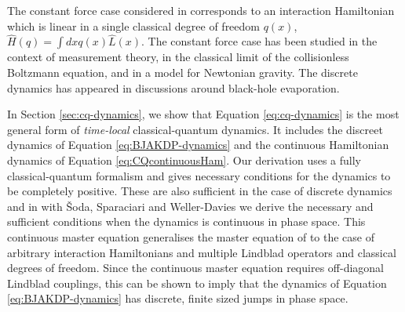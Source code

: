 \documentclass[aps,pra,showpacs,citeautoscript,amsmath,amssymb,floatfix,superscriptaddress,bbm, verbatim,amsfonts,changes,10pt,nofootinbib,longbibliography]{revtex4-1}
\def\L{{\hat{L}}}
\def\Hq{\hat{H}}
\begin{document}
The constant force case considered in \cite{diosi1995quantum} corresponds to an interaction Hamiltonian which is linear in a single classical degree of freedom $q(x)$,  $\Hq(q)=\int dx q(x)\L(x)$.  The constant force case has
been studied in the context of measurement theory\cite{diosi2014hybrid}, in the classical limit of the collisionless Boltzmann equation\cite{alicki2003completely}, and in a model for Newtonian gravity\cite{diosi2011gravity}. The discrete dynamics has appeared in discussions around black-hole evaporation\cite{poulinKITP}. %


 In Section \ref{sec:cq-dynamics}, we show that Equation \eqref{eq:cq-dynamics} is the most general form of  {\it time-local}\cite{ktimelocal_foot}
  classical-quantum dynamics. It includes the discreet dynamics of Equation \eqref{eq:BJAKDP-dynamics} and the continuous Hamiltonian dynamics of Equation \eqref{eq:CQcontinuousHam}.
 Our derivation uses a fully classical-quantum formalism and gives necessary conditions for the dynamics to be completely positive. %
These are also sufficient in the case of discrete dynamics and in \cite{UCLPawula} with  Šoda, Sparaciari and Weller-Davies we derive the necessary and sufficient conditions when the dynamics is continuous in phase space.\label{par:necsuf} This continuous master equation generalises the master equation of \cite{diosi1995quantum} to the case of arbitrary interaction Hamiltonians and multiple Lindblad operators and classical degrees of freedom. Since the continuous master equation requires off-diagonal Lindblad couplings, this can be shown to imply that the dynamics of Equation \eqref{eq:BJAKDP-dynamics}  has discrete, finite sized jumps in phase space\cite{UCLPawula}. 
\end{document}
